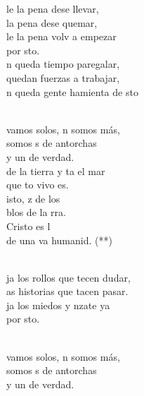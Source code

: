 \documentclass[12pt]{article}
\begin{document}
\begin{multicols*}{2}
\begin{cancion}%
	le la pena dese llevar,\\
	 la pena dese quemar,\\
	le la pena volv a empezar \\
	por sto. \\
\jump
	n queda tiempo paregalar, \\
	 quedan fuerzas a trabajar,\\
	n queda gente hamienta de sto\\\jump\\
	\begin{chorus}%
	 vamos solos, n somos más,\\
	somos s de antorchas \\
	y un  de verdad.\\
	de la tierra y ta el mar\\
	que to vivo es. \\
\jump
	isto, z de los \\
	blos de la rra.\\
	Cristo es l \\
	de una va humanid. (**)\\
	\end{chorus}%
	\jump\\
	ja los rollos que tecen dudar,\\
	as historias que tacen pasar.\\
	ja los miedos y nzate ya  \\
	por sto. \\\jump\\
	\begin{chorus}%
	 vamos solos, n somos más,\\
	somos s de antorchas \\
	y un  de verdad.\\

\end{chorus}
\end{cancion}
\end{multicols*}
\end{document}
